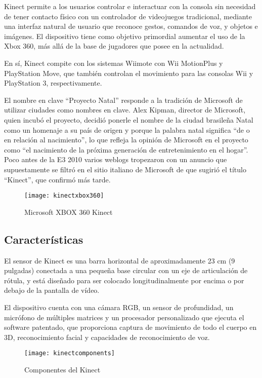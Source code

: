 Kinect permite a los usuarios controlar e interactuar con la consola sin necesidad de tener contacto físico con un controlador de videojuegos tradicional, mediante una interfaz natural de usuario que reconoce gestos, comandos de voz, y objetos e imágenes. El dispositivo tiene como objetivo primordial aumentar el uso de la Xbox 360, más allá de la base de jugadores que posee en la actualidad.

En sí, Kinect compite con los sistemas Wiimote con Wii MotionPlus y PlayStation Move, que también controlan el movimiento para las consolas Wii y PlayStation 3, respectivamente.

El nombre en clave ``Proyecto Natal'' responde a la tradición de Microsoft de utilizar ciudades como nombres en clave. Alex Kipman, director de Microsoft, quien incubó el proyecto, decidió ponerle el nombre de la ciudad brasileña Natal como un homenaje a su país de origen y porque la palabra natal significa ``de o en relación al nacimiento'', lo que refleja la opinión de Microsoft en el proyecto como ``el nacimiento de la próxima generación de entretenimiento en el hogar''. Poco antes de la E3 2010 varios weblogs tropezaron con un anuncio que supuestamente se filtró en el sitio italiano de Microsoft de que sugirió el título ``Kinect'', que confirmó más tarde.

\begin{figure}[h]
\centering
\texttt{[image: kinectxbox360]}
\caption{Microsoft XBOX 360 Kinect}
\end{figure}

\subsection{Características}
El sensor de Kinect es una barra horizontal de aproximadamente 23 cm (9 pulgadas) conectada a una pequeña base circular con un eje de articulación de rótula, y está diseñado para ser colocado longitudinalmente por encima o por debajo de la pantalla de vídeo.

El dispositivo cuenta con una cámara RGB, un sensor de profundidad, un micrófono de múltiples matrices y un procesador personalizado que ejecuta el software patentado, que proporciona captura de movimiento de todo el cuerpo en 3D, reconocimiento facial y capacidades de reconocimiento de voz.

\begin{figure}[h]
\centering
\texttt{[image: kinectcomponents]}
\caption{Componentes del Kinect}
\end{figure}

